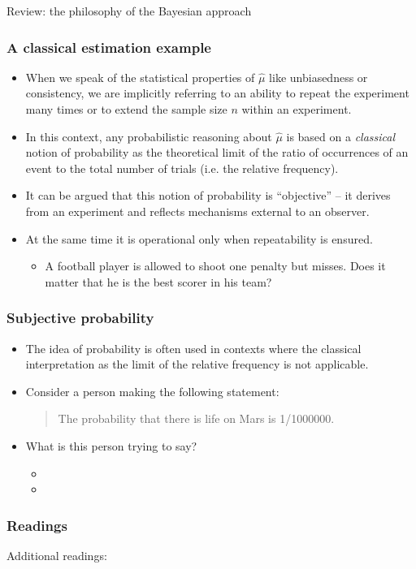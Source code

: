 \documentclass[10pt]{beamer}
\theoremstyle{definition}
\begin{document}
\begin{section}{Review: the philosophy of the Bayesian approach}
\begin{frame}
\frametitle{A classical estimation example}
\begin{itemize}\itemsep1em
\item When we speak of the statistical properties of $\hat{\mu}$ like unbiasedness or consistency, we are implicitly referring to an ability to repeat the experiment many times or to extend the sample size $ n $ within an experiment.
\item In this context, any probabilistic reasoning about $\hat{\mu}$ is based on a \emph{classical} notion of probability as the theoretical limit of the ratio of occurrences of an event to the total number of trials (i.e. the relative frequency).
\item It can be argued that this notion of probability is ``objective'' -- it derives from an experiment and reflects mechanisms external to an observer.
\item At the same time it is operational only when repeatability is ensured.
	\begin{itemize}\itemsep1em
	\item A football player is allowed to shoot one penalty but misses. Does it matter that he is the best scorer in his team?
	\end{itemize}
\end{itemize}
\end{frame}

\begin{frame}
\frametitle{Subjective probability}
\begin{itemize}\itemsep1em
\item The idea of probability is often used in contexts where the classical interpretation as the limit of the relative frequency is not applicable.
\item Consider a person making the following statement: \begin{quote}
The probability that there is life on Mars is 1/1000000.
\end{quote}
\item What is this person trying to say?
	\begin{itemize}\itemsep1em
	\item 
	\item 
	\end{itemize}
\end{itemize}
\end{frame}

\end{section}



\begin{frame}[fragile]
\frametitle{Readings}
Additional readings:\bigskip


\end{frame}
\end{document}
